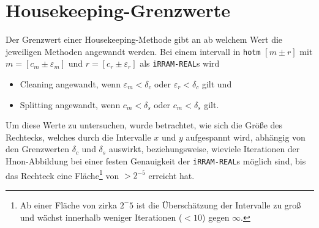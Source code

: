 \section{Housekeeping-Grenzwerte}
Der Grenzwert einer Housekeeping-Methode gibt an ab welchem Wert die jeweiligen Methoden angewandt werden. Bei einem intervall in \verb+hotm+ $[m \pm r]$ mit $m = [c_m \pm \varepsilon_m]$ und $r = [c_r \pm \varepsilon_r]$ als \verb+iRRAM-REAL+s wird
\begin{itemize}
 \item Cleaning angewandt, wenn $\varepsilon_m < \delta_c$ oder $\varepsilon_r < \delta_c$ gilt und
 \item Splitting angewandt, wenn $c_m < \delta_s$ oder $c_m < \delta_s$ gilt.
\end{itemize}
Um diese Werte zu untersuchen, wurde betrachtet, wie sich die Größe des Rechtecks, welches durch die Intervalle $x$ und $y$ aufgespannt wird, abhängig von den Grenzwerten $\delta_c$ und $\delta_s$ auswirkt, beziehungsweise, wieviele Iterationen der H\e non-Abbildung bei einer festen Genauigkeit der \verb+iRRAM-REAL+s möglich sind, bis das Rechteck eine Fläche\footnote{Ab einer Fläche von zirka $2^-{5}$ ist die Überschätzung der Intervalle zu groß und wächst innerhalb weniger Iterationen ($< 10$) gegen $\infty$.} von $>2^{-5}$ erreicht hat.


